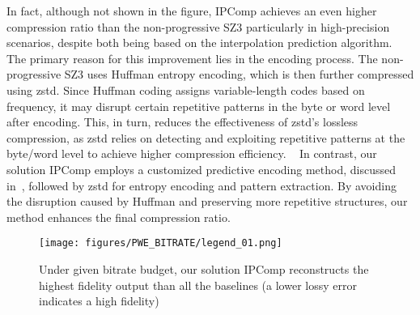 In fact, although not shown in the figure, IPComp achieves an even higher compression ratio than the non-progressive SZ3 particularly in high-precision scenarios, despite both being based on the interpolation prediction algorithm.
The primary reason for this improvement lies in the encoding process. The non-progressive SZ3 uses Huffman entropy encoding, which is then further compressed using zstd. Since Huffman coding assigns variable-length codes based on frequency, it may disrupt certain repetitive patterns in the byte or word level after encoding. This, in turn, reduces the effectiveness of zstd’s lossless compression, as zstd relies on detecting and exploiting repetitive patterns at the byte/word level to achieve higher compression efficiency. ~\cite{rfc8478}
In contrast, our solution IPComp employs a customized predictive encoding method, discussed in~, followed by zstd for entropy encoding and pattern extraction. By avoiding the disruption caused by Huffman and preserving more repetitive structures, our method enhances the final compression ratio.






\begin{figure}[ht] \centering

\texttt{[image: figures/PWE\_BITRATE/legend\_01.png]}

\vspace{-3mm}


\vspace{-3mm}

\caption{Under given bitrate budget, our solution IPComp reconstructs the highest fidelity output than all the baselines (a lower lossy error indicates a high fidelity)}
\label{fig:pwe_bitrate}
\vspace{-3mm}

\end{figure}

